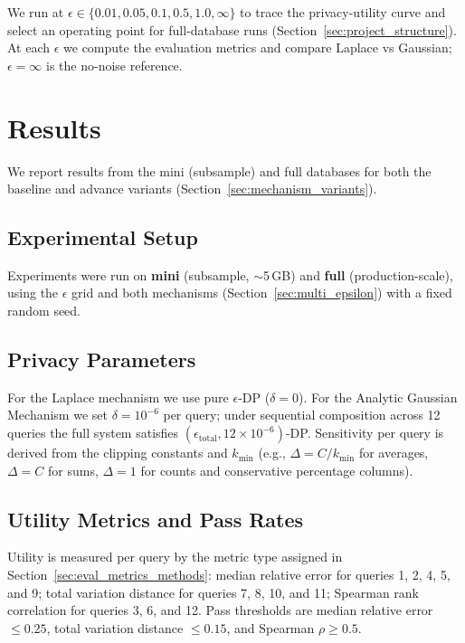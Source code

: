 \documentclass[12pt,letterpaper]{article}
\begin{document}
We run at $\epsilon \in \{0.01, 0.05, 0.1, 0.5, 1.0, \infty\}$ to trace the privacy-utility curve and select an operating point for full-database runs (Section~\ref{sec:project_structure}). At each $\epsilon$ we compute the evaluation metrics and compare Laplace vs Gaussian; $\epsilon = \infty$ is the no-noise reference.

\section{Results}
\label{sec:results}

We report results from the mini (subsample) and full databases for both the baseline and advance variants (Section~\ref{sec:mechanism_variants}).

\subsection{Experimental Setup}
\label{sec:exp_setup}

Experiments were run on \textbf{mini} (subsample, $\sim$5\,GB) and \textbf{full} (production-scale), using the $\epsilon$ grid and both mechanisms (Section~\ref{sec:multi_epsilon}) with a fixed random seed.

\subsection{Privacy Parameters}
\label{sec:privacy_params}

For the Laplace mechanism we use pure $\epsilon$-DP ($\delta = 0$). For the Analytic Gaussian Mechanism we set $\delta = 10^{-6}$ per query; under sequential composition across 12 queries the full system satisfies $(\epsilon_{\text{total}}, 12 \times 10^{-6})$-DP. Sensitivity per query is derived from the clipping constants and $k_{\min}$ (e.g., $\Delta = C/k_{\min}$ for averages, $\Delta = C$ for sums, $\Delta = 1$ for counts and conservative percentage columns).

\subsection{Utility Metrics and Pass Rates}
\label{sec:utility_metrics}

Utility is measured per query by the metric type assigned in Section~\ref{sec:eval_metrics_methods}: median relative error for queries 1, 2, 4, 5, and 9; total variation distance for queries 7, 8, 10, and 11; Spearman rank correlation for queries 3, 6, and 12. Pass thresholds are median relative error $\leq 0.25$, total variation distance $\leq 0.15$, and Spearman $\rho \geq 0.5$.
\end{document}
